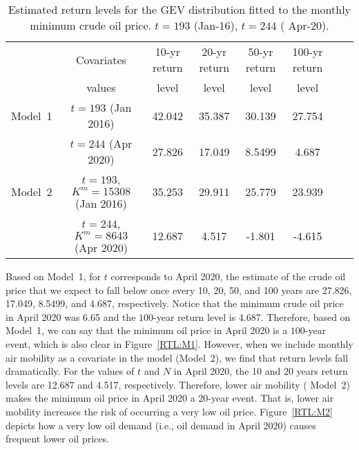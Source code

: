 \documentclass[review]{elsarticle}
\begin{document}
\begin{table*} [!ht]
	\caption{Estimated return levels for the GEV distribution fitted to the monthly minimum crude oil price.  $t=193$ (Jan-16), $t=244$ ( Apr-20).}
	\label{return_level2}	
	\begin{center}
		\begin{tabular}{l*{6}{c}r} \hline
			
			& Covariates    & 10-yr return  & 20-yr return  & 50-yr return  & 100-yr return    \\
			& values &   level & level &  level  &  level  \\
			
					\hline
	            	Model~1	& $t=193$ (Jan 2016)    & 42.042 & 35.387 &  30.139 & 27.754 \\
			                & $t=244$  (Apr 2020)  & 27.826  &  17.049 &  8.5499 & 4.687\\
			                
			                
			\hline
	   Model~2	& $t=193$, $K^m=15308$ (Jan 2016)   & 35.253 & 29.911 & 25.779 & 23.939 \\
			    & $t=244$, $K^m=8643$  (Apr 2020)  & 12.687 & 4.517 &  -1.801 & -4.615\\
			    
			\hline 
		\end{tabular}
	\end{center}
\end{table*}


Based on Model~1, for $t$ corresponds to April 2020, the estimate of the crude oil price that we expect to fall below once every
10, 20, 50, and 100 years are 27.826, 17.049, 8.5499, and 4.687, respectively.
Notice that the minimum crude oil price in April 2020 was 6.65 and the $100$-year return level is 4.687. Therefore, based on Model~1, we can say that the minimum oil price in April 2020 is a $100$-year event, which is also clear in Figure~\ref{RTL:M1}.
However, when we include monthly air mobility as a covariate in the model (Model~2), we find that return levels fall dramatically.
For the values of $t$ and $N$ in April 2020, the 10 and 20 years return levels are 12.687 and 4.517, respectively. Therefore, lower air mobility ( Model~2) makes the minimum oil price in April 2020 a $20$-year event. That is, lower air mobility increases the risk of occurring a very low oil price.
Figure~\ref{RTL:M2} depicts how a very low oil demand (i.e., oil demand in April 2020) causes frequent lower oil prices.
\end{document}
